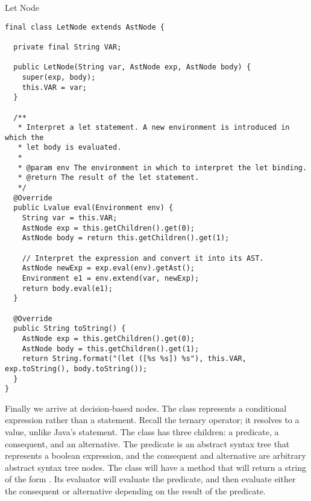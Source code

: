 \begin{cl}{Let Node}
\begin{lstlisting}[language=MyJava]
final class LetNode extends AstNode {

  private final String VAR;

  public LetNode(String var, AstNode exp, AstNode body) {
    super(exp, body);
    this.VAR = var;
  }

  /**
   * Interpret a let statement. A new environment is introduced in which the
   * let body is evaluated.
   *
   * @param env The environment in which to interpret the let binding.
   * @return The result of the let statement.
   */
  @Override
  public Lvalue eval(Environment env) {
    String var = this.VAR;
    AstNode exp = this.getChildren().get(0);
    AstNode body = return this.getChildren().get(1);

    // Interpret the expression and convert it into its AST.
    AstNode newExp = exp.eval(env).getAst();
    Environment e1 = env.extend(var, newExp);
    return body.eval(e1);
  }

  @Override
  public String toString() {
    AstNode exp = this.getChildren().get(0);
    AstNode body = this.getChildren().get(1);
    return String.format("(let ([%s %s]) %s"), this.VAR, exp.toString(), body.toString());
  }
}
\end{lstlisting}
\end{cl}

Finally we arrive at decision-based nodes. The  class represents a conditional expression rather than a statement. Recall the ternary operator; it resolves to a value, unlike Java's  statement. The  class has three children: a predicate, a consequent, and an alternative. The predicate is an abstract syntax tree that represents a boolean expression, and the consequent and alternative are arbitrary abstract syntax tree nodes. The  class will have a  method that will return a string of the form . Its evaluator will evaluate the predicate, and then evaluate either the consequent or alternative depending on the result of the predicate.

